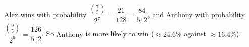 Alex wins with probability $\dfrac{\binom75}{2^7}=\dfrac{21}{128}=\dfrac{84}{512}$, and Anthony with probability $\dfrac{\binom95}{2^9}=\dfrac{126}{512}$. So $\boxed{\text{Anthony}}$ is more likely to win ($\approx24.6\%$ against $\approx16.4\%$).
